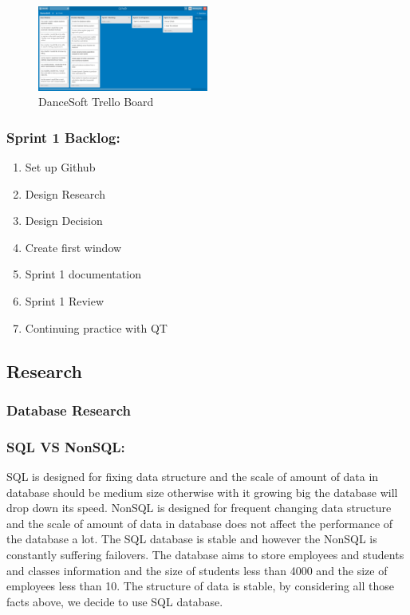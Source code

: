 \begin{figure}
\caption{DanceSoft Trello Board}
\centering
\includegraphics[width=0.5\textwidth]{d1}
\end{figure}



\subsubsection{Sprint 1 Backlog:}

\begin{enumerate}
\item Set up Github
\item Design Research
\item Design Decision
\item Create first window
\item Sprint 1 documentation
\item Sprint 1 Review
\item Continuing practice with QT

\end{enumerate}

\subsection{Research}

\subsubsection{Database Research}

\subsubsection{SQL VS NonSQL:}
SQL is designed for fixing data structure and the scale of amount of data in database should be medium size otherwise with it growing big the database will drop down its speed. NonSQL is designed for frequent changing data structure and the scale of amount of data in database does not affect the performance of the database a lot. The SQL database is stable and however the NonSQL is constantly suffering failovers. The database aims to store employees and students and classes information and the size of students less than 4000 and the size of employees less than 10. The structure of data is stable, by considering all those facts above, we decide to use SQL database.\\

